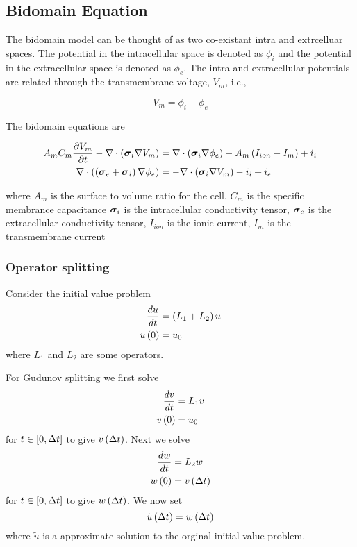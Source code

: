 \subsection{Bidomain Equation}

The bidomain model can be thought of as two co-existant intra and extrcelluar
spaces. The potential in the intracellular space is denoted as
$\phi_{i}$ and the potential in the extracellular space is denoted as
$\phi_{e}$. The intra and extracellular potentials are related through the
transmembrane voltage, $V_{m}$, i.e.,

\begin{equation}
  V_{m}=\phi_{i}-\phi_{e}
  \label{eqn:transmembranevoltage}
\end{equation} 

The bidomain equations are

\begin{align}
  A_{m}C_{m}\delby{V_{m}}{t}-\divergence{}{\pbrac{\tensor{\sigma}_{i}\grad{V_{m}}}}&=\divergence{}{\pbrac{\tensor{\sigma}_{i}\grad{\phi_{e}}}}-A_{m}\pbrac{I_{ion}-I_{m}}+i_{i} \label{eqn:bidomain1}
  \\
  \divergence{}{\pbrac{\pbrac{\tensor{\sigma}_{e}+\tensor{\sigma}_{i}}\grad{\phi_{e}}}}&=-\divergence{}{\pbrac{\tensor{\sigma}_{i}\grad{V_{m}}}}-i_{i}+i_{e}
  \label{eqn:bidomain2}
\end{align}

where $A_{m}$ is the surface to volume ratio for the cell, $C_{m}$ is
the specific membrance capacitance $\boldsymbol{\mathit{\sigma}}_{i}$ is the intracellular
conductivity tensor, $\boldsymbol{\mathit{\sigma}}_{e}$ is the extracellular
conductivity tensor, $I_{ion}$ is the ionic current, $I_{m}$ is the
transmembrane current

\subsubsection{Operator splitting}

Consider the initial value problem
\begin{align}
   \dfrac{ d u}{d t} &=\left( L_{1}+L_{2} \right)u \\
   u\left( 0 \right) &=u_{0}
\end{align}
where $L_{1}$ and $L_{2}$ are some operators.

For Gudunov splitting we first solve
\begin{align}
   \dfrac{ d v}{d t} &=L_{1}v \\
   v\left( 0 \right) &=u_{0}
\end{align}
for $t\in\left[ 0,\Delta t \right]$ to give $ v\left( \Delta t \right) $. Next we solve
\begin{align}
   \dfrac{ d w}{d t} &=L_{2}w \\
   w\left( 0 \right) &= v\left( \Delta t \right) 
\end{align}
for $t\in\left[ 0,\Delta t \right]$ to give $ w\left( \Delta t \right) $. We now set
\begin{equation}
 \tilde{u}\left( \Delta t \right) = w\left( \Delta t \right) 
\end{equation}
where $\tilde{u}$ is a approximate solution to the orginal initial value
problem.

